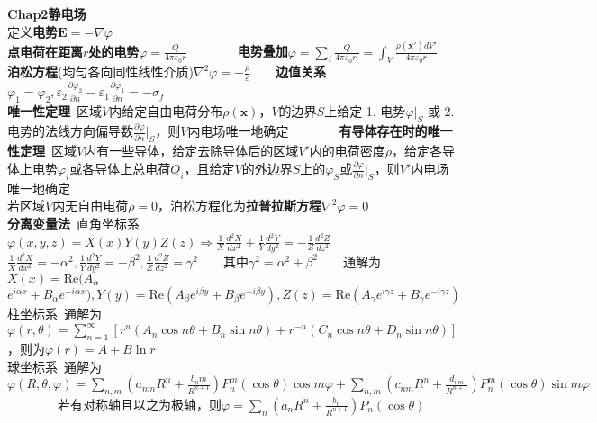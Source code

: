 \documentclass[10pt,a4paper]{article}
\begin{document}
\begin{multicols}{2}
\noindent\textbf{Chap2静电场}\\
定义\textbf{电势}$\bm{E}=-\nabla\varphi$\\
\textbf{点电荷在距离$r$处的电势}$\varphi=\frac{Q}{4\pi\varepsilon_0r}$~~~~~~~~\textbf{电势叠加}$\varphi=\sum_i\frac{Q}{4\pi\varepsilon_or_i}=\int_V\frac{\rho(\bm{x}')dV'}{4\pi\varepsilon_0r}$\\
\textbf{泊松方程}\tiny(均匀各向同性线性介质)\scriptsize$\nabla^2\varphi=-\frac{\rho}{\varepsilon}$~~~~\textbf{边值关系}$\varphi_1=\varphi_2,\varepsilon_2\frac{\partial\varphi_2}{\partial n}-\varepsilon_1\frac{\partial\varphi_1}{\partial n}=-\sigma_f$\\
\tiny\textbf{唯一性定理}~区域$V$内给定自由电荷分布$\rho(\bm{x})$，$V$的边界$S$上给定 1. 电势$\varphi|_{S}$ 或 2. 电势的法线方向偏导数$\frac{\partial\varphi}{\partial n}|_S$，则$V$内电场唯一地确定~~~~~~~~\textbf{有导体存在时的唯一性定理}~区域$V$内有一些导体，给定去除导体后的区域$V'$内的电荷密度$\rho$，给定各导体上电势$\varphi_i$或各导体上总电荷$Q_i$，且给定$V$的外边界$S$上的$\varphi_S$或$\frac{\partial\varphi}{\partial n}|_S$，则$V'$内电场唯一地确定\\
若区域$V$内无自由电荷$\rho=0$，泊松方程化为\textbf{拉普拉斯方程}$\nabla^2\varphi=0$\\
\textbf{分离变量法}~直角坐标系$\varphi(x,y,z)=X(x)Y(y)Z(z)\Rightarrow\frac{1}{X}\frac{d^2X}{dx^2}+\frac{1}{Y}\frac{d^2Y}{dy^2}=-\frac{1}{Z}\frac{d^2Z}{dz^2}$\\
$\frac{1}{X}\frac{d^2X}{dx^2}=-\alpha^2,\frac{1}{Y}\frac{d^2Y}{dy^2}=-\beta^2,\frac{1}{Z}\frac{d^2Z}{dz^2}=\gamma^2$~~~~其中$\gamma^2=\alpha^2+\beta^2$~~~~通解为$X(x)=\text{Re}(A_{\alpha}$\\
\indent$e^{i\alpha x}+B_{\alpha}e^{-i\alpha x}),Y(y)=\text{Re}(A_{\beta}e^{i\beta y}+B_{\beta}e^{-i\beta y}),Z(z)=\text{Re}(A_{\gamma}e^{i\gamma z}+B_{\gamma}e^{-i\gamma z})$\\
柱坐标系~通解为$\varphi(r,\theta)=\sum_{n=1}^{\infty}[r^n(A_n\cos n\theta+B_n\sin n\theta)+r^{-n}(C_n\cos n\theta+D_n\sin n\theta)]$\\
，则为$\varphi(r)=A+B\ln r$\\
球坐标系~通解为$\varphi(R,\theta,\varphi)=\sum_{n,m}(a_{nm}R^n+\frac{b_nm}{R^{n+1}})P_n^m(\cos\theta)\cos m\varphi+\sum_{n,m}(c_{nm}R^n+\frac{d_{nm}}{R^{n+1}})P_n^m(\cos\theta)\sin m\varphi$~~~~~~~~若有对称轴且以之为极轴，则$\varphi=\sum_n(a_nR^n+\frac{b_n}{R^{n+1}})P_n(\cos\theta)$\\

\end{multicols}
\end{document}
